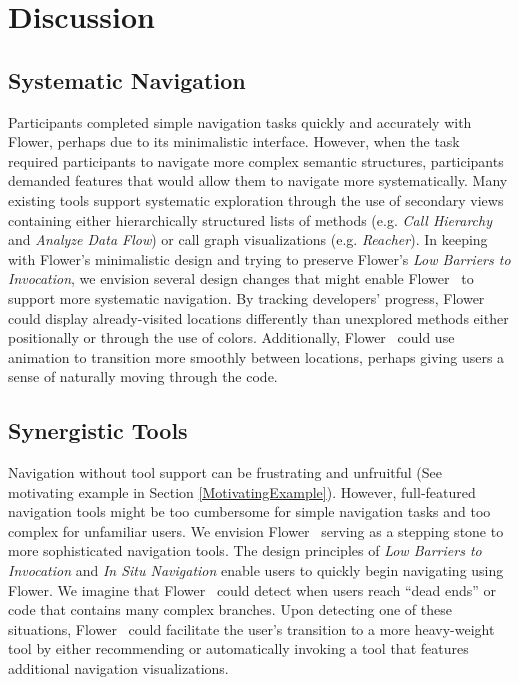\documentclass[conference]{IEEEtran}
\newcommand{\toolName}{Flower}
\begin{document}

\section{Discussion}

\subsection{Systematic Navigation}
Participants completed simple navigation tasks quickly and accurately with \toolName, perhaps due to its minimalistic interface.
However, when the task required participants to navigate more complex semantic structures, participants demanded features that would allow them to navigate more systematically.
Many existing tools support systematic exploration through the use of secondary views containing either hierarchically structured lists of methods (e.g. \textit{Call Hierarchy} and \textit{Analyze Data Flow}) or call graph visualizations (e.g. \textit{Reacher}).
In keeping with \toolName's minimalistic design and trying to preserve \toolName's \textit{Low Barriers to Invocation}, we envision several design changes that might enable \toolName~ to support more systematic navigation.
By tracking developers' progress, \toolName~ could display already-visited locations differently than unexplored methods either positionally or through the use of colors.
Additionally, \toolName~ could use animation to transition more smoothly between locations, perhaps giving users a sense of naturally moving through the code.


\subsection{Synergistic Tools}
Navigation without tool support can be frustrating and unfruitful (See motivating example in Section \ref{MotivatingExample}). 
However, full-featured navigation tools might be too cumbersome for simple navigation tasks and too complex for unfamiliar users.
We envision \toolName~ serving as a stepping stone to more sophisticated navigation tools. 
The design principles of \textit{Low Barriers to Invocation} and \textit{In Situ Navigation} enable users to quickly begin navigating using \toolName. 
We imagine that \toolName~ could detect when users reach ``dead ends'' or code that contains many complex branches.
Upon detecting one of these situations, \toolName~ could facilitate the user's transition to a more heavy-weight tool by either recommending or automatically invoking a tool that features additional navigation visualizations.
\end{document}
